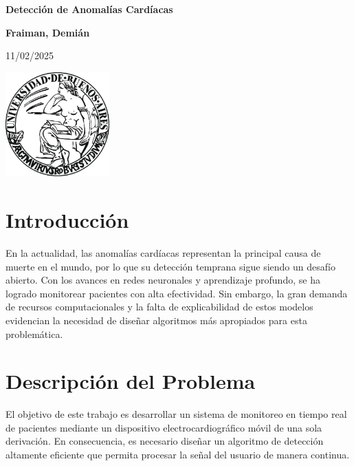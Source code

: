 \documentclass[titlepage,a4paper]{article}
\begin{document}
\begin{titlepage} 
    \begin{center}
        \vspace*{3cm} %
        {\Huge \textbf{Detección de Anomalías Cardíacas}} 
        
        \vspace{2cm}
        {\Large \textbf{Fraiman, Demián}}
        
        \vfill
        {\large 11/02/2025} %
        
        \vspace{2cm}
        \includegraphics[width=0.3\textwidth]{Logo_de_la_Universidad_de_Buenos_Aires.jpg} %
    \end{center}
\end{titlepage}

\tableofcontents %
\newpage

\section{Introducción}\label{sec:intro}
En la actualidad, las anomalías cardíacas representan la principal causa de muerte en el mundo, por lo que su detección temprana sigue siendo un desafío abierto. Con los avances en redes neuronales y aprendizaje profundo, se ha logrado monitorear pacientes con alta efectividad. Sin embargo, la gran demanda de recursos computacionales y la falta de explicabilidad de estos modelos evidencian la necesidad de diseñar algoritmos más apropiados para esta problemática.

\section{Descripción del Problema}\label{sec:supuestos}

El objetivo de este trabajo es desarrollar un sistema de monitoreo en tiempo real de pacientes mediante un dispositivo electrocardiográfico móvil de una sola derivación. En consecuencia, es necesario diseñar un algoritmo de detección altamente eficiente que permita procesar la señal del usuario de manera continua.  
\end{document}

